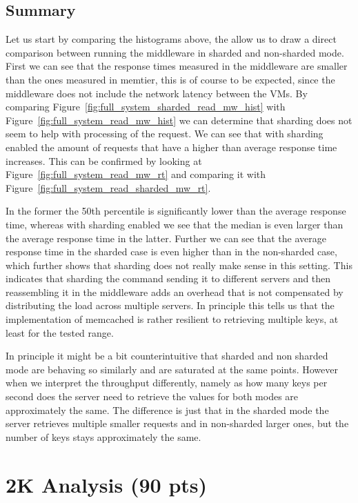 \documentclass[11pt,a4paper]{article}
\begin{document}
\subsection{Summary}
%
Let us start by comparing the histograms above, the allow us to draw a direct comparison between running the middleware in sharded and non-sharded mode.
%
First we can see that the response times measured in the middleware are smaller than the ones measured in memtier, this is of course to be expected, since the middleware does not include the network latency between the VMs.
%
By comparing Figure~\ref{fig:full_system_sharded_read_mw_hist} with Figure~\ref{fig:full_system_read_mw_hist} we can determine that sharding does not seem to help with processing of the request. 
%
We can see that with sharding enabled the amount of requests that have a higher than average response time increases.
%
This can be confirmed by looking at Figure~\ref{fig:full_system_read_mw_rt} and comparing it with Figure~\ref{fig:full_system_read_sharded_mw_rt}.
%
\par
%
In the former the 50th percentile is significantly lower than the average response time, whereas with sharding enabled we see that the median is even larger than the average response time in the latter.
%
Further we can see that the average response time in the sharded case is even higher than in the non-sharded case, which further shows that sharding does not really make sense in this setting.
%
This indicates that sharding the command sending it to different servers and then reassembling it in the middleware adds an overhead that is not compensated by distributing the load across multiple servers.
%
In principle this tells us that the implementation of memcached is rather resilient to retrieving multiple keys, at least for the tested range.
%
\par
%
In principle it might be a bit counterintuitive that sharded and non sharded mode are behaving so similarly and are saturated at the same points.
%
However when we interpret the throughput differently, namely as how many keys per second does the server need to retrieve the values for both modes are approximately the same.
%
The difference is just that in the sharded mode the server retrieves multiple smaller requests and in non-sharded larger ones, but the number of keys stays approximately the same.
%
\section{2K Analysis (90 pts)}
%
\end{document}
